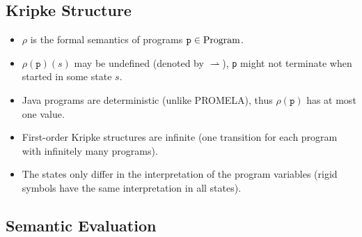 		\subsection{Kripke Structure}
		
			\begin{itemize}
				\item \(\rho\) is the formal semantics of programs \( \texttt{p} \in \operatorname{Program} \).
				\item \( \rho(\texttt{p})(s) \) may be undefined (denoted by \( \rightharpoonup \)), \texttt{p} might not terminate when started in some state \(s\).
				\item Java programs are deterministic (unlike PROMELA), thus \( \rho(\texttt{p}) \) has at most one value.
				\item First-order Kripke structures are infinite (one transition for each program with infinitely many programs).
				\item The states only differ in the interpretation of the program variables (rigid symbols have the same interpretation in all states).
			\end{itemize}

		\subsection{Semantic Evaluation}
